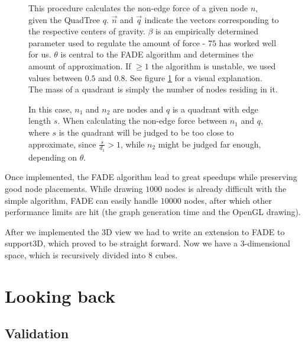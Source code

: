 \documentclass[a4paper,11pt,titlepage]{article}
\let\stdsection\section         %
\renewcommand{\section}{\newpage\stdsection}
\begin{document}
\begin{figure}[ht]
  \begin{minipage}[b]{0.5\linewidth}
    
    \caption{This procedure calculates the non-edge force of a given
      node \(n\), given the QuadTree \(q\). \(\vec{n}\) and
      \(\vec{q}\) indicate the vectors corresponding to the respective
      centers of gravity. \(\beta\) is an empirically determined
      parameter used to regulate the amount of force - \(75\) has
      worked well for us. \(\theta\) is central to the FADE algorithm
      and determines the amount of approximation. If \(\geq 1\) the
      algorithm is unstable, we used values between \(0.5\) and
      \(0.8\). See figure \ref{fig:theta} for a visual
      explanation. The mass of a quadrant is simply the number of
      nodes residing in it. }
    \label{proc:FADE}
  \end{minipage}
  \hspace{10pt}
  \begin{minipage}[b]{0.5\linewidth}
    \centering
    
    \caption{In this case, \(n_1\) and \(n_2\) are nodes and \(q\) is
      a quadrant with edge length \(s\). When calculating the non-edge
      force between \(n_1\) and \(q\), where \(s\) is the quadrant
      will be judged to be too close to approximate, since
      \(\frac{s}{d_1} > 1\), while \(n_2\) might be judged far enough,
      depending on \(\theta\).}
    \label{fig:theta}
  \end{minipage}
\end{figure}

Once implemented, the FADE algorithm lead to great speedups while
preserving good node placements. While drawing \(1000\) nodes is
already difficult with the simple algorithm, FADE can easily handle
\(10000\) nodes, after which other performance limits are hit (the
graph generation time and the OpenGL drawing).

After we implemented the 3D view we had to write an extension to FADE to support3D, which proved to be straight forward. Now we have a 3-dimensional space,
which is recursively divided into $8$ cubes.




\section{Looking back}

\subsection{Validation}
\end{document}
